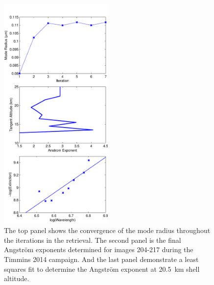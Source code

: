 \documentclass[12pt]{article}
\begin{document}
\begin{figure}
\includegraphics[width=0.5\textwidth]{./Images/ParticelSize.pdf}
    \caption{The top panel shows the convergence of the mode radius throughout the iterations in the retrieval. The second panel is the final Angstr\"{o}m exponents determined for images 204-217 during the Timmins 2014 campaign. And the last panel demonstrate a least squares fit to determine the Angstr\"{o}m exponent at 20.5~km shell altitude.}
    \label{fig:ParticleSize}
\end{figure}
\end{document}
